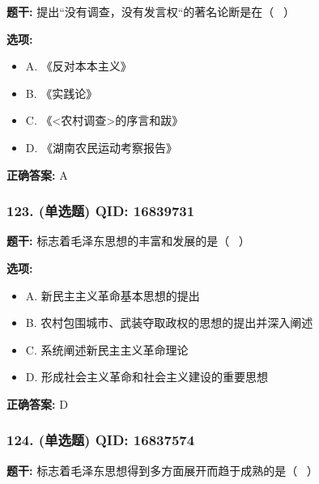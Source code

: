 \documentclass[12pt,UTF8]{ctexart}
\begin{document}
\textbf{题干:}
提出“没有调查，没有发言权“的著名论断是在（  ）

\textbf{选项:}
\begin{itemize}[leftmargin=*]

  \item A. 《反对本本主义》

  \item B. 《实践论》

  \item C. 《<农村调查>的序言和跋》

  \item D. 《湖南农民运动考察报告》

\end{itemize}

\textbf{正确答案:}
A

\vspace{0.3em}\hrulefill\vspace{0.7em}

\subsubsection*{123. (单选题) \small QID: 16839731}

\textbf{题干:}
标志着毛泽东思想的丰富和发展的是（  ）

\textbf{选项:}
\begin{itemize}[leftmargin=*]

  \item A. 新民主主义革命基本思想的提出

  \item B. 农村包围城市、武装夺取政权的思想的提出并深入阐述

  \item C. 系统阐述新民主主义革命理论

  \item D. 形成社会主义革命和社会主义建设的重要思想

\end{itemize}

\textbf{正确答案:}
D

\vspace{0.3em}\hrulefill\vspace{0.7em}

\subsubsection*{124. (单选题) \small QID: 16837574}

\textbf{题干:}
标志着毛泽东思想得到多方面展开而趋于成熟的是（  ）
\end{document}
